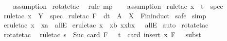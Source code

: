 \begin{isabellebody}
\ {}\ \isanewline
{}\isamarkupfalse%
\ {\isacharparenleft}assumption{\isacharparenright}\isanewline
{}\isamarkupfalse%
\ {\isacharparenleft}rotate{\isacharunderscore}tac\ {}{\isacharparenright}\isanewline
{}\isamarkupfalse%
\ {\isacharparenleft}rule\ mp{\isacharparenright}\isanewline
{}\isamarkupfalse%
\ {}\ \isanewline
{}\isamarkupfalse%
\ {\isacharparenleft}assumption{\isacharparenright}\isanewline
{}\isamarkupfalse%
\ {\isacharparenleft}rule{\isacharunderscore}tac\ x\ {\isacharequal}\ {\isachardoublequoteopen}t{\isachardoublequoteclose}\ \ spec{\isacharparenright}\isanewline
{}\isamarkupfalse%
\ {\isacharparenleft}rule{\isacharunderscore}tac\ x\ {\isacharequal}\ {\isachardoublequoteopen}Y{\isachardoublequoteclose}\ \ spec{\isacharparenright}\isanewline
{}\isamarkupfalse%
\ {\isacharparenleft}rule{\isacharunderscore}tac\ F\ {\isacharequal}\ {\isachardoublequoteopen}dt{\isachardoublequoteclose}\ \ A\ {\isacharequal}\ {\isachardoublequoteopen}X{\isachardoublequoteclose}\ \ Fin{\isacharunderscore}induct{\isacharparenright}\isanewline
{}\isamarkupfalse%
\ safe\isanewline
{}\isamarkupfalse%
\ simp\isanewline
{}\isamarkupfalse%
\ {\isacharparenleft}erule{\isacharunderscore}tac\ x\ {\isacharequal}\ {\isachardoublequoteopen}xa{\isachardoublequoteclose}\ \ allE{\isacharparenright}\isanewline
{}\isamarkupfalse%
\ {\isacharparenleft}erule{\isacharunderscore}tac\ x\ {\isacharequal}\ {\isachardoublequoteopen}xb{\isacharminus}{\isacharbraceleft}\ {\isacharparenleft}x{\isacharcomma}xb{\isacharpercent}{\isacharcircum}x{\isacharparenright}\ {\isacharbraceright}{\isachardoublequoteclose}\ \ allE{\isacharparenright}\isanewline
{}\isamarkupfalse%
\ auto\isanewline
{}\isamarkupfalse%
\ {\isacharparenleft}rotate{\isacharunderscore}tac\ {}{\isacharparenright}\isanewline
{}\isamarkupfalse%
\ {\isacharparenleft}rotate{\isacharunderscore}tac\ {}{\isacharparenright}\isanewline
{}\isamarkupfalse%
\ {\isacharparenleft}rule{\isacharunderscore}tac\ s\ {\isacharequal}\ {\isachardoublequoteopen}Suc\ {\isacharparenleft}card\ F{\isacharparenright}\ {\isachardoublequoteclose}\ \ t\ {\isacharequal}\ {\isachardoublequoteopen}card\ {\isacharparenleft}insert\ x\ F{\isacharparenright}\ {\isachardoublequoteclose}\ \ subst{\isacharparenright}\isanewline

\end{isabellebody}

